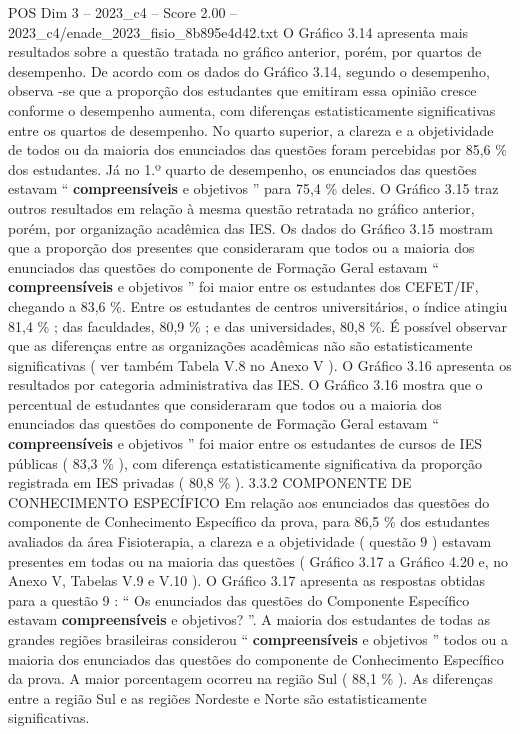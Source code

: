 \begin{textsample}{POS Dim 3 – 2023\_c4 – Score 2.00 – 2023\_c4/enade\_2023\_fisio\_8b895e4d42.txt}
O Gráfico 3.14 apresenta mais resultados sobre a questão tratada no gráfico anterior, porém, por quartos de desempenho.
De acordo com os dados do Gráfico 3.14, segundo o desempenho, observa -se que a proporção dos estudantes que emitiram essa opinião cresce conforme o desempenho aumenta, com diferenças estatisticamente significativas entre os quartos de desempenho.
No quarto superior, a clareza e a objetividade de todos ou da maioria dos enunciados das questões foram percebidas por 85,6 \% dos estudantes.
Já no 1.º quarto de desempenho, os enunciados das questões estavam “ \textbf{compreensíveis} e objetivos ” para 75,4 \% deles.
O Gráfico 3.15 traz outros resultados em relação à mesma questão retratada no gráfico anterior, porém, por organização acadêmica das IES.
Os dados do Gráfico 3.15 mostram que a proporção dos presentes que consideraram que todos ou a maioria dos enunciados das questões do componente de Formação Geral estavam “ \textbf{compreensíveis} e objetivos ” foi maior entre os estudantes dos CEFET/IF, chegando a 83,6 \%.
Entre os estudantes de centros universitários, o índice atingiu 81,4 \% ; das faculdades, 80,9 \% ; e das universidades, 80,8 \%.
É possível observar que as diferenças entre as organizações acadêmicas não são estatisticamente significativas ( ver também Tabela V.8 no Anexo V ).
O Gráfico 3.16 apresenta os resultados por categoria administrativa das IES.
O Gráfico 3.16 mostra que o percentual de estudantes que consideraram que todos ou a maioria dos enunciados das questões do componente de Formação Geral estavam “ \textbf{compreensíveis} e objetivos ” foi maior entre os estudantes de cursos de IES públicas ( 83,3 \% ), com diferença estatisticamente significativa da proporção registrada em IES privadas ( 80,8 \% ). 3.3.2 COMPONENTE DE CONHECIMENTO ESPECÍFICO Em relação aos enunciados das questões do componente de Conhecimento Específico da prova, para 86,5 \% dos estudantes avaliados da área Fisioterapia, a clareza e a objetividade ( questão 9 ) estavam presentes em todas ou na maioria das questões ( Gráfico 3.17 a Gráfico 4.20 e, no Anexo V, Tabelas V.9 e V.10 ).
O Gráfico 3.17 apresenta as respostas obtidas para a questão 9 : “ Os enunciados das questões do Componente Específico estavam \textbf{compreensíveis} e objetivos? ”.
A maioria dos estudantes de todas as grandes regiões brasileiras considerou “ \textbf{compreensíveis} e objetivos ” todos ou a maioria dos enunciados das questões do componente de Conhecimento Específico da prova.
A maior porcentagem ocorreu na região Sul ( 88,1 \% ).
As diferenças entre a região Sul e as regiões Nordeste e Norte são estatisticamente significativas.

\end{textsample}
